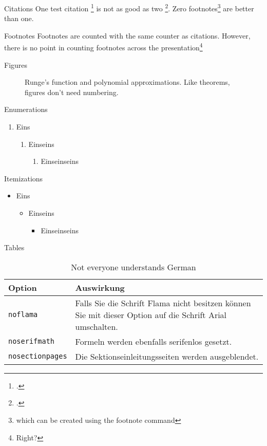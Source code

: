 \documentclass{beamer}
\begin{document}
\begin{frame}{Citations}
One test citation \footcite{AdamsFournier2003} is not as good as two \footcite{AlexanderianPetraStadlerEtAl2016}. 
Zero footnotes\footnote{which can be created using the footnote command} are better than one.
\end{frame}

\begin{frame}{Footnotes}
Footnotes are counted with the same counter as citations. However, there is no point in counting footnotes across the presentation\footnote{Right?}
\end{frame}
	
\begin{frame}{Figures}
\begin{figure}
	\scalebox{0.6}{}
	\caption{Runge's function and polynomial approximations. Like theorems, figures don't need numbering.}
\end{figure}
\end{frame}

\begin{frame}{Enumerations}
\begin{enumerate}
	\item Eins
	\begin{enumerate}
		\item Einseins
		\begin{enumerate}
			\item Einseinseins
		\end{enumerate}
	\end{enumerate}
\end{enumerate}
\end{frame}

\begin{frame}{Itemizations}
\begin{itemize}
	\item Eins
	\begin{itemize}
		\item Einseins
		\begin{itemize}
			\item Einseinseins
		\end{itemize}
	\end{itemize}
\end{itemize}
\end{frame}

\begin{frame}{Tables}
\begin{table}[]
	\begin{tabularx}{\linewidth}{l>{\raggedright}X}
			\toprule
			\textbf{Option}			& \textbf{Auswirkung} \tabularnewline
			\midrule
			\texttt{noflama}		& Falls Sie die Schrift Flama nicht besitzen können Sie mit dieser Option auf die Schrift Arial umschalten. \tabularnewline
			\texttt{noserifmath}		& Formeln werden ebenfalls serifenlos gesetzt. \tabularnewline
			\texttt{nosectionpages} & Die Sektionseinleitungsseiten werden ausgeblendet.\tabularnewline
			\bottomrule
	\end{tabularx}
	\caption{Not everyone understands German}
\end{table}
\end{frame}
\end{document}
